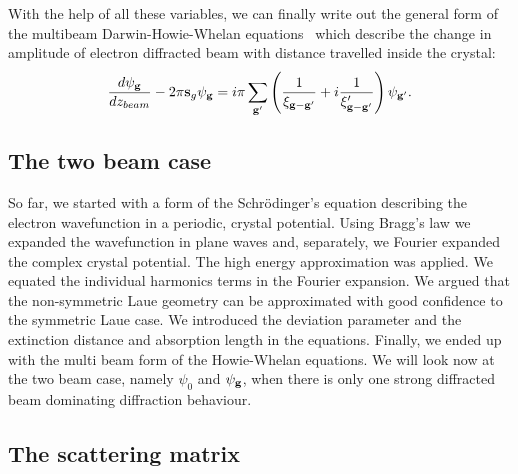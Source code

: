 With the help of all these variables, we can finally write out the general form of the multibeam Darwin-Howie-Whelan equations~\cite{Howie61} which describe the change in amplitude of electron diffracted beam with distance travelled inside the crystal:
\begin{equation}
     \frac{d \psi_\mathbf{g}}{dz_{beam}} - 2 \pi  \vb{s}_g \psi_{\vb{g}} = i \pi \sum_{\vb{g}'} \left( \frac{1}{\xi_{\vb{g}-\vb{g}'}} +i\frac{1}{\xi'_{\vb{g}-\vb{g}'}}\right) \psi_{\vb{g}'}.
\end{equation}


%
\subsection{The two beam case}

So far, we started with a form of the Schr{\"o}dinger's equation describing the electron wavefunction in a periodic, crystal potential. Using Bragg's law we expanded the wavefunction in plane waves and, separately, we Fourier expanded the complex crystal potential. The high energy approximation was applied. We equated the individual harmonics terms in the Fourier expansion. We argued that the non-symmetric Laue geometry can be approximated with good confidence to the symmetric Laue case. We introduced the deviation parameter and the extinction distance and absorption length in the equations. Finally, we ended up with the multi beam form of the Howie-Whelan equations. We will look now at the two beam case, namely $\psi_0$ and $\psi_{\vb{g}}$, when there is only one strong diffracted beam dominating diffraction behaviour. 




%

\subsection{The scattering matrix}

%
